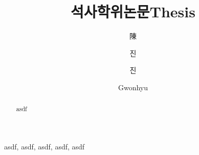 \documentclass[master,english,final,pdfdoc]{dgist-ucs}
\title[korean] {석사학위논문}
\title[english]{Thesis}
\author[korean] {陳}{權 携}
\author[korean2] {진}{권휴}    %
\author[chinese] {진}{권 휴}
\author[english]{Gwonhyu}{Jin}
\begin{document}


   \thesisinfo
    \begin{abstract}
        
        asdf
		
	\end{abstract} 

    \begin{Engkeyword}
	    asdf, asdf, asdf, asdf, asdf
	\end{Engkeyword}





%
%

    \makecontents






% 


\end{document}
